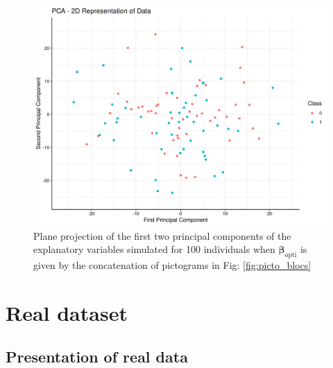 \documentclass[preprint,12pt]{elsarticle}
\begin{document}
\begin{figure}[tbp]
    \centering
    \includegraphics[scale = 0.5]{./images/clusters.png}
    \caption{Plane projection of the first two principal components of the explanatory variables simulated for 100 individuals when $\bm{\beta}_{\text{opti}}$ is given by the concatenation of pictograms in Fig: \ref{fig:picto_blocs}
    \label{fig:compos_plan}}
\end{figure}



\newpage

\section{Real dataset}

\subsection{Presentation of real data}
\end{document}
